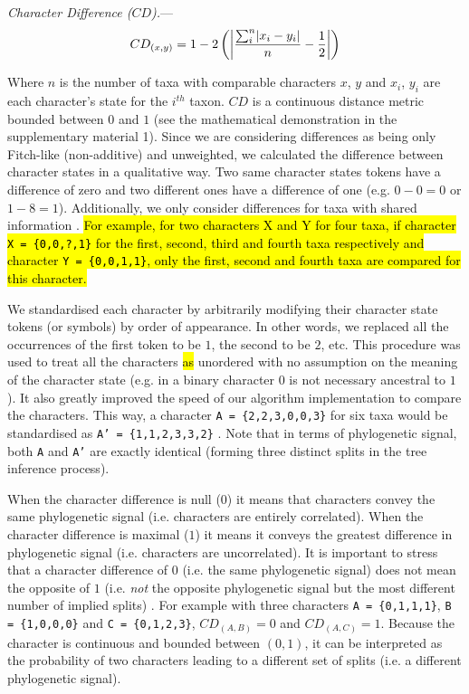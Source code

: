 \documentclass[12pt,letterpaper]{article}
\DeclarePairedDelimiter\abs{\lvert}{\rvert}%
\renewcommand{\subsubsection}[1]{%
\vspace{2ex}
\noindent
\textit{#1.}---}
\begin{document}
\subsubsection{Character Difference ($CD$)}
\begin{equation}
    CD_{(x,y)} = 1 - 2\left(\abs*{\frac{\sum_{i}^{n}\abs{x_{i} - y_{i}}}{n}-\frac{1}{2}}\right)
\end{equation}


\noindent Where $n$ is the number of taxa with comparable characters $x$, $y$ and $x_i$, $y_i$ are each character's state for the $i^{th}$ taxon.
$CD$ is a continuous distance metric bounded between $0$ and $1$ (see the mathematical demonstration in the supplementary material 1).
Since we are considering differences as being only Fitch-like (non-additive) and unweighted, we calculated the difference between character states in a qualitative way.
Two same character states tokens have a difference of zero and two different ones have a difference of one (e.g. $0 - 0 = 0$ or $1 - 8 = 1$).
Additionally, we only consider differences for taxa with shared information \citep[i.e. a Gower distance;][]{GowerDist}.
\hl{For example, for two characters X and Y for four taxa, if character \texttt{X = \{0,0,?,1\}} for the first, second, third and fourth taxa respectively and character \texttt{Y = \{0,0,1,1\}}, only the first, second and fourth taxa are compared for this character.}

We standardised each character by arbitrarily modifying their character state tokens (or symbols) by order of appearance.
In other words, we replaced all the occurrences of the first token to be $1$, the second to be $2$, etc.
This procedure was used to treat all the characters \hl{as} unordered with no assumption on the meaning of the character state (e.g. in a binary character $0$ is not necessary ancestral to $1$).
It also greatly improved the speed of our algorithm implementation to compare the characters.
This way, a character \texttt{A = \{2,2,3,0,0,3\}} for six taxa would be standardised as \texttt{A' = \{1,1,2,3,3,2\}} \citep[following the \textit{xyz} notation in][p.13]{felsenstein2004inferring}.
Note that in terms of phylogenetic signal, both \texttt{A} and \texttt{A'} are exactly identical (forming three distinct splits in the tree inference process).

When the character difference is null ($0$) it means that characters convey the same phylogenetic signal (i.e. characters are entirely correlated).
When the character difference is maximal ($1$) it means it conveys the greatest difference in phylogenetic signal (i.e. characters are uncorrelated).
It is important to stress that a character difference of $0$ (i.e. the same phylogenetic signal) does not mean the opposite of $1$ (i.e. \textit{not} the opposite phylogenetic signal but the most different number of implied splits) .
For example with three characters \texttt{A = \{0,1,1,1\}}, \texttt{B = \{1,0,0,0\}} and \texttt{C = \{0,1,2,3\}}, $CD_{(A,B)} = 0$ and $CD_{(A,C)} = 1$.
Because the character is continuous and bounded between $(0,1)$, it can be interpreted as the probability of two characters leading to a different set of splits (i.e. a different phylogenetic signal).
\end{document}
